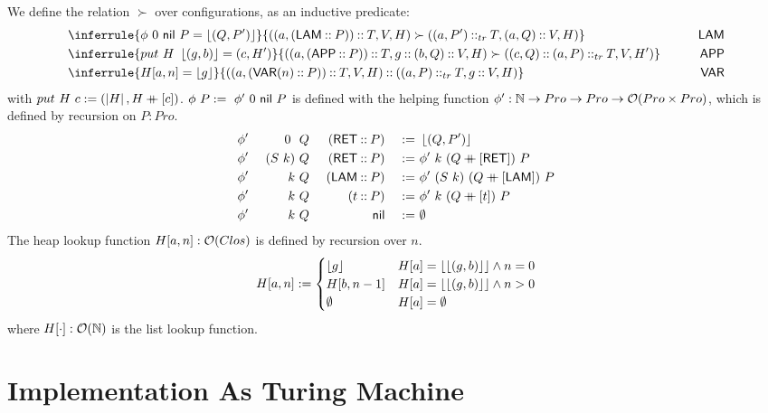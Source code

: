 \begin{definition}
  We define the relation $\succ$ over configurations, as an inductive predicate:
  \begin{alignat*}{2}
    & \inferrule{\phi~0~\nil~P = \Some{(Q, P')}}{\left((a, (\MS{LAM} \cons P)) \cons T, V, H\right) \succ \left((a, P') \cons_{tr} T, (a,Q) \cons V, H\right) }
    \qquad& \MS{LAM} & \\
    & \inferrule{put~H~\Some{(g,b)} = (c,H')}{\left((a, (\MS{APP} \cons P)) \cons T, g \cons (b, Q) \cons V, H\right) \succ \left((c, Q) \cons (a,P) \cons_{tr} T, V, H'\right)}
    \qquad& \MS{APP} \\
    & \inferrule{H[a,n]=\Some{g}}{\left((a, (\MS{VAR}(n) \cons P)) \cons T, V, H\right) \cons \left((a, P) \cons_{tr} T, g \cons V, H\right)}
    \qquad& \MS{VAR} &
  \end{alignat*}
  with $ put~H~c := (\left| H \right|, H \mathbin{+\mkern-10mu+} [c]) $. $\phi~P :=~ \phi'~0~\mathsf{nil}~P$ is defined with the helping function
  $\phi' : \mathbb{N} \rightarrow Pro \rightarrow Pro \rightarrow \mathcal{O}(Pro \times Pro)$, which is defined by recursion on $P:Pro$.
  \begin{alignat*}{4}
    &\phi'&~0~   &~Q&~(\mathsf{RET} \mathbin{::} P) &&~:=~& \left\lfloor {(Q,P')} \right\rfloor \\
    &\phi'&~(S~k)&~Q&~(\mathsf{RET} \mathbin{::} P) &&~:=~& \phi'~k~(Q \mathbin{+\mkern-10mu+} [\mathsf{RET}])~P \\
    &\phi'&~k    &~Q&~(\mathsf{LAM} \mathbin{::} P) &&~:=~& \phi'~(S~k)~(Q \mathbin{+\mkern-10mu+} [\mathsf{LAM}])~P \\
    &\phi'&~k    &~Q&~(t        \mathbin{::} P) &&~:=~& \phi'~k~(Q \mathbin{+\mkern-10mu+} [t])~P \\
    &\phi'&~k    &~Q&~              \mathsf{nil} &&~:=~& \emptyset \\
  \end{alignat*}
  The heap lookup function $H[a,n] : \mathcal{O}(Clos)$ is defined by recursion over $n$.
  \[
    H[a,n] :=
    \begin{cases}
      \left\lfloor {g} \right\rfloor  & H[a]=\left\lfloor {\left\lfloor {(g,b)} \right\rfloor} \right\rfloor \land n=0 \\
      H[b, n-1] & H[a]=\left\lfloor {\left\lfloor {(g,b)} \right\rfloor} \right\rfloor \land n>0 \\
      \emptyset     & H[a]=\emptyset
    \end{cases}
  \]
  where $H[\cdot] : \mathcal{O}(\mathbb{N})$ is the list lookup function.
\end{definition}


\section{Implementation As Turing Machine}
\label{sec:heap-implementation}

